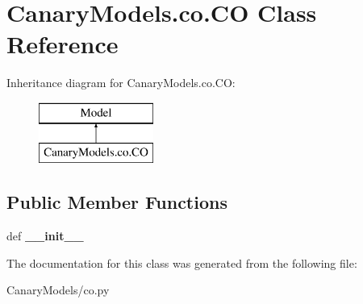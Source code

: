 \hypertarget{class_canary_models_1_1co_1_1_c_o}{\section{Canary\-Models.\-co.\-C\-O Class Reference}
\label{class_canary_models_1_1co_1_1_c_o}
}
Inheritance diagram for Canary\-Models.\-co.\-C\-O\-:\begin{figure}[H]
\begin{center}
\leavevmode
\includegraphics[height=2.000000cm]{class_canary_models_1_1co_1_1_c_o}
\end{center}
\end{figure}
\subsection*{Public Member Functions}
\begin{DoxyCompactItemize}
\item 
\hypertarget{class_canary_models_1_1co_1_1_c_o_aeb352e92961c67ab8958bf3c8f060f22}{def {\bfseries \-\_\-\-\_\-init\-\_\-\-\_\-}}\label{class_canary_models_1_1co_1_1_c_o_aeb352e92961c67ab8958bf3c8f060f22}

\end{DoxyCompactItemize}


The documentation for this class was generated from the following file\-:\begin{DoxyCompactItemize}
\item 
Canary\-Models/co.\-py\end{DoxyCompactItemize}
